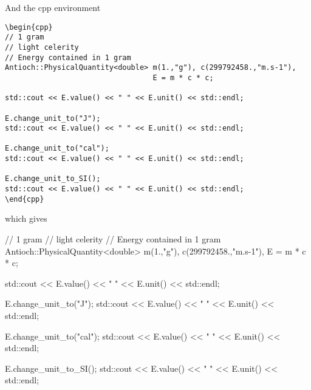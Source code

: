 \documentclass{documentation}
\begin{document}
And the \textsf{cpp} environment
\begin{verbatim}
\begin{cpp} 
// 1 gram 
// light celerity
// Energy contained in 1 gram
Antioch::PhysicalQuantity<double> m(1.,"g"), c(299792458.,"m.s-1"), 
                                  E = m * c * c; 

std::cout << E.value() << " " << E.unit() << std::endl;

E.change_unit_to("J");
std::cout << E.value() << " " << E.unit() << std::endl;

E.change_unit_to("cal");
std::cout << E.value() << " " << E.unit() << std::endl;

E.change_unit_to_SI();
std::cout << E.value() << " " << E.unit() << std::endl;
\end{cpp}
\end{verbatim}
which gives
\begin{cpp} 
// 1 gram 
// light celerity
// Energy contained in 1 gram
Antioch::PhysicalQuantity<double> m(1.,"g"), c(299792458.,"m.s-1"), 
                                  E = m * c * c; 

std::cout << E.value() << " " << E.unit() << std::endl;

E.change_unit_to("J");
std::cout << E.value() << " " << E.unit() << std::endl;

E.change_unit_to("cal");
std::cout << E.value() << " " << E.unit() << std::endl;

E.change_unit_to_SI();
std::cout << E.value() << " " << E.unit() << std::endl;
\end{cpp}
\end{document}
